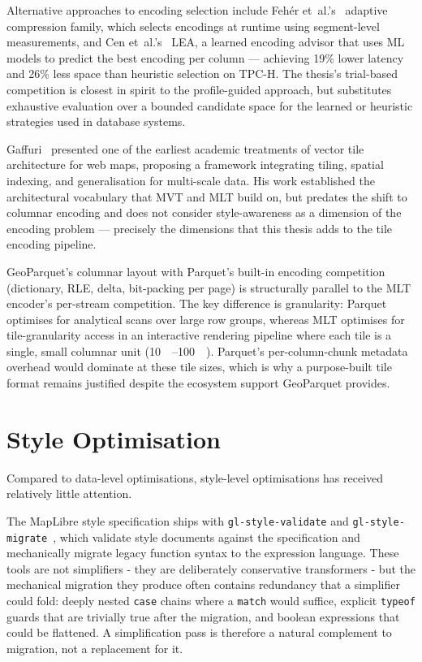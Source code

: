 Alternative approaches to encoding selection include Fehér et~al.'s~\cite{feherAdaptiveColumnCompression2022} adaptive compression family, which selects encodings at runtime using segment-level measurements, and Cen et~al.'s~\cite{cenLEALearnedEncoding2021} LEA, a learned encoding advisor that uses ML models to predict the best encoding per column --- achieving 19\% lower latency and 26\% less space than heuristic selection on TPC-H.
The thesis's trial-based competition is closest in spirit to the profile-guided approach, but substitutes exhaustive evaluation over a bounded candidate space for the learned or heuristic strategies used in database systems.

Gaffuri~\cite{gaffuriWebMappingVector2012} presented one of the earliest academic treatments of vector tile architecture for web maps, proposing a framework integrating tiling, spatial indexing, and generalisation for multi-scale data.
His work established the architectural vocabulary that MVT and MLT build on, but predates the shift to columnar encoding and does not consider style-awareness as a dimension of the encoding problem --- precisely the dimensions that this thesis adds to the tile encoding pipeline.

GeoParquet's columnar layout with Parquet's built-in encoding competition (dictionary, \ac{RLE}, delta, bit-packing per page) is structurally parallel to the \ac{MLT} encoder's per-stream competition.
The key difference is granularity: Parquet optimises for analytical scans over large row groups, whereas \ac{MLT} optimises for tile-granularity access in an interactive rendering pipeline where each tile is a single, small columnar unit (\qtyrange{10}{100}{\kilo\byte}).
Parquet's per-column-chunk metadata overhead would dominate at these tile sizes, which is why a purpose-built tile format remains justified despite the ecosystem support GeoParquet provides.

\section{Style Optimisation}\label{sec_rw_style_optimisations}

Compared to data-level optimisations, style-level optimisations has received relatively little attention.

\begin{sloppypar}
The MapLibre style specification ships with \texttt{gl\allowbreak-style\allowbreak-validate} and \texttt{gl\allowbreak-style\allowbreak-migrate}~\cite{MapLibreStyleSpec}, which validate style documents against the specification and mechanically migrate legacy function syntax to the expression language.
These tools are not simplifiers - they are deliberately conservative transformers - but the mechanical migration they produce often contains redundancy that a simplifier could fold: deeply nested \texttt{case} chains where a \texttt{match} would suffice, explicit \texttt{typeof} guards that are trivially true after the migration, and boolean expressions that could be flattened.
A simplification pass is therefore a natural complement to migration, not a replacement for it.
\end{sloppypar}

